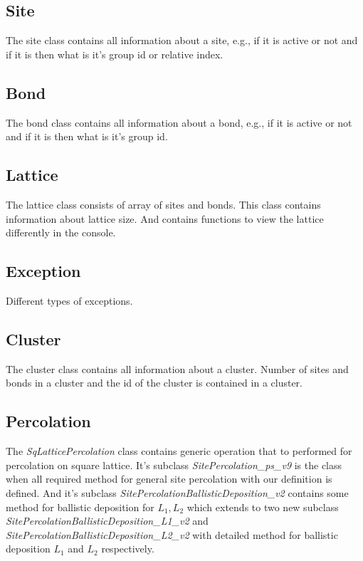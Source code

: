 	\subsection{Site}
	The site class contains all information about a site, e.g., if it is active or not and if it is then what is it's group id or relative index.
	
	
	\subsection{Bond}
	The bond class contains all information about a bond, e.g., if it is active or not and if it is then what is it's group id.
	
			
	\subsection{Lattice}
	The lattice class consists of array of sites and bonds. This class contains information about lattice size. And contains functions to view the lattice differently in the console.
	
	
	\subsection{Exception}
	Different types of exceptions.
	
	
	\subsection{Cluster}
	The cluster class contains all information about a cluster. Number of sites and bonds in a cluster and the id of the cluster is contained in a cluster.
	
	
	\subsection{Percolation}
	The \textit{SqLatticePercolation} class contains generic operation that to performed for percolation on square lattice. It's subclass  \textit{SitePercolation\_ps\_v9} is the class when all required method for general site percolation with our definition is defined. 
	And it's subclass \textit{SitePercolationBallisticDeposition\_v2}
	contains some method for ballistic deposition for $L_1,L_2$ which extends to two new subclass \textit{SitePercolationBallisticDeposition\_L1\_v2} and \textit{SitePercolationBallisticDeposition\_L2\_v2} with detailed method for ballistic deposition $L_1$ and $L_2$ respectively.
	
